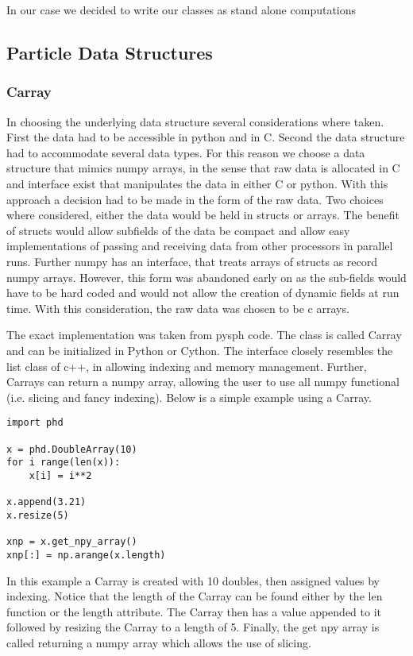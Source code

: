 In our case we decided to write our classes as stand alone computations

\subsection{Particle Data Structures}
\subsubsection{Carray}
In choosing the underlying data structure several considerations where taken. First the
data had to be accessible in python and in C. Second the data structure had to
accommodate several data types. For this reason we choose a data structure that mimics
numpy arrays, in the sense that raw data is allocated in C and interface exist that
manipulates the data in either C or python. With this approach a decision had to be
made in the form of the raw data. Two choices where considered, either the data would
be held in structs or arrays. The benefit of structs would allow subfields of the data
be compact and allow easy implementations of passing and receiving data from other
processors in parallel runs. Further numpy has an interface, that treats
arrays of structs as record numpy arrays. However, this form was abandoned early on
as the sub-fields would have to be hard coded and would not allow the creation of
dynamic fields at run time. With this consideration, the raw data was chosen to be
c arrays. 

The exact implementation was taken from pysph code. The class is called Carray and
can be initialized in Python or Cython. The interface closely resembles the list
class of c++, in allowing indexing and memory management. Further, Carrays can return
a numpy array, allowing the user to use all numpy functional (i.e. slicing and fancy indexing). 
Below is a simple example using a Carray.
\begin{lstlisting}
import phd

x = phd.DoubleArray(10)
for i range(len(x)):
	x[i] = i**2
    
x.append(3.21)
x.resize(5)

xnp = x.get_npy_array()
xnp[:] = np.arange(x.length)
\end{lstlisting}
In this example a Carray is created with 10 doubles, then assigned values by indexing. Notice
that the length of the Carray can be found either by the len function or the length
attribute. The Carray then has a value appended to it followed by resizing the Carray to a length
of 5. Finally, the get npy array is called returning a numpy array which allows the use of slicing.

